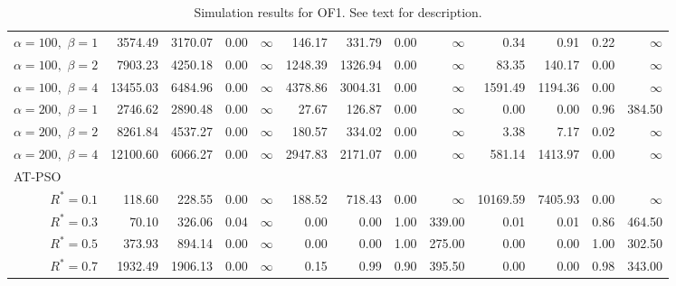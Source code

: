\documentclass[12pt]{article}
\begin{document}
\begin{table}[ht]
{\begin{tabular}{r|rrrr|rrrr|rrrr}
  $\alpha = 100,$ $\beta =1$ & 3574.49 & 3170.07 & 0.00 & $\infty$ & 146.17 & 331.79 & 0.00 & $\infty$ & 0.34 & 0.91 & 0.22 & $\infty$ \\ 
  $\alpha = 100,$ $\beta =2$ & 7903.23 & 4250.18 & 0.00 & $\infty$ & 1248.39 & 1326.94 & 0.00 & $\infty$ & 83.35 & 140.17 & 0.00 & $\infty$ \\ 
  $\alpha = 100,$ $\beta =4$ & 13455.03 & 6484.96 & 0.00 & $\infty$ & 4378.86 & 3004.31 & 0.00 & $\infty$ & 1591.49 & 1194.36 & 0.00 & $\infty$ \\ 
  $\alpha = 200,$ $\beta =1$ & 2746.62 & 2890.48 & 0.00 & $\infty$ & 27.67 & 126.87 & 0.00 & $\infty$ & 0.00 & 0.00 & 0.96 & 384.50 \\ 
  $\alpha = 200,$ $\beta =2$ & 8261.84 & 4537.27 & 0.00 & $\infty$ & 180.57 & 334.02 & 0.00 & $\infty$ & 3.38 & 7.17 & 0.02 & $\infty$ \\ 
  $\alpha = 200,$ $\beta =4$ & 12100.60 & 6066.27 & 0.00 & $\infty$ & 2947.83 & 2171.07 & 0.00 & $\infty$ & 581.14 & 1413.97 & 0.00 & $\infty$ \\ 
\hline
\multicolumn{1}{l|}{AT-PSO} &&&&&&&&&&&&\\
  $R^* = 0.1$ & 118.60 & 228.55 & 0.00 & $\infty$ & 188.52 & 718.43 & 0.00 & $\infty$ & 10169.59 & 7405.93 & 0.00 & $\infty$ \\ 
  $R^* = 0.3$ & 70.10 & 326.06 & 0.04 & $\infty$ & 0.00 & 0.00 & 1.00 & 339.00 & 0.01 & 0.01 & 0.86 & 464.50 \\ 
  $R^* = 0.5$ & 373.93 & 894.14 & 0.00 & $\infty$ & 0.00 & 0.00 & 1.00 & 275.00 & 0.00 & 0.00 & 1.00 & 302.50 \\ 
  $R^* = 0.7$ & 1932.49 & 1906.13 & 0.00 & $\infty$ & 0.15 & 0.99 & 0.90 & 395.50 & 0.00 & 0.00 & 0.98 & 343.00 \\ 
   \hline
\end{tabular}
}
\caption{Simulation results for OF1. See text for description.}
\label{tab:psosim1}
\end{table}
\end{document}
